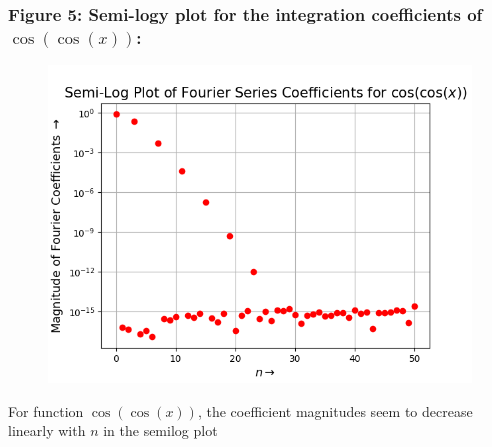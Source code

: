 \documentclass[12pt, a4paper]{article}
\begin{document}
\subsubsection{Figure 5: Semi-logy plot for the integration coefficients of $\cos(\cos(x))$:}
\vspace*{-0.5cm}
\begin{figure}[H]
    \centering
    \includegraphics[scale = 0.75]{Figure_5.png}
    \label{fig:sample}
\end{figure}
\vspace*{-0.5cm}
\begin{center}
    For function $\cos(\cos(x))$, the coefficient magnitudes seem to decrease linearly with $n$ in the semilog plot
\end{center}
\end{document}
